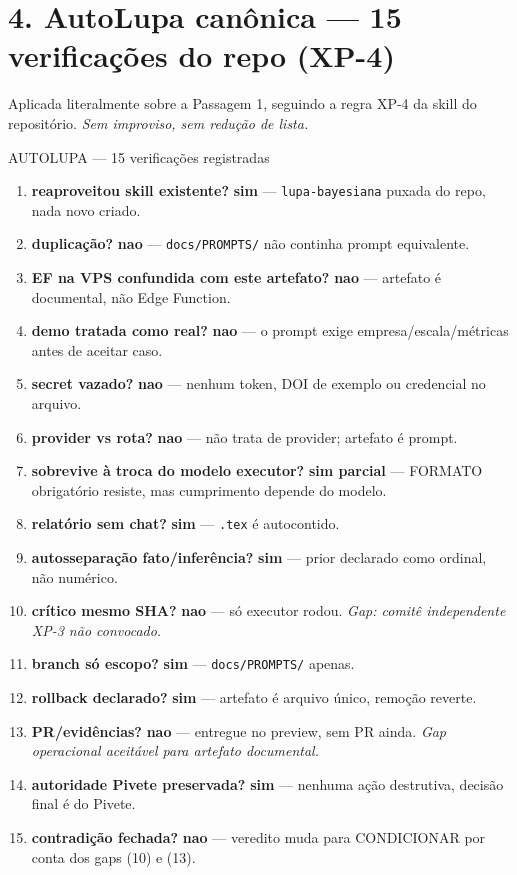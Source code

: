 \documentclass[11pt,a4paper]{article}
\begin{document}
\section*{4. AutoLupa canônica --- 15 verificações do repo (XP-4)}

Aplicada literalmente sobre a Passagem 1, seguindo a regra XP-4
da skill do repositório. \emph{Sem improviso, sem redução de
lista.}

\begin{bloco}{AUTOLUPA --- 15 verificações registradas}
\begin{enumerate}[leftmargin=1.9em]
  \item \textbf{reaproveitou skill existente?} \textbf{sim} ---
        \texttt{lupa-bayesiana} puxada do repo, nada novo criado.
  \item \textbf{duplicação?} \textbf{nao} --- \texttt{docs/PROMPTS/}
        não continha prompt equivalente.
  \item \textbf{EF na VPS confundida com este artefato?}
        \textbf{nao} --- artefato é documental, não Edge Function.
  \item \textbf{demo tratada como real?} \textbf{nao} --- o
        prompt exige empresa/escala/métricas antes de aceitar caso.
  \item \textbf{secret vazado?} \textbf{nao} --- nenhum token,
        DOI de exemplo ou credencial no arquivo.
  \item \textbf{provider vs rota?} \textbf{nao} --- não trata de
        provider; artefato é prompt.
  \item \textbf{sobrevive à troca do modelo executor?}
        \textbf{sim parcial} --- FORMATO obrigatório resiste,
        mas cumprimento depende do modelo.
  \item \textbf{relatório sem chat?} \textbf{sim} --- \texttt{.tex}
        é autocontido.
  \item \textbf{autosseparação fato/inferência?} \textbf{sim} ---
        prior declarado como ordinal, não numérico.
  \item \textbf{crítico mesmo SHA?} \textbf{nao} --- só executor
        rodou. \emph{Gap: comitê independente XP-3 não convocado.}
  \item \textbf{branch só escopo?} \textbf{sim} ---
        \texttt{docs/PROMPTS/} apenas.
  \item \textbf{rollback declarado?} \textbf{sim} --- artefato é
        arquivo único, remoção reverte.
  \item \textbf{PR/evidências?} \textbf{nao} --- entregue no
        preview, sem PR ainda. \emph{Gap operacional aceitável
        para artefato documental.}
  \item \textbf{autoridade Pivete preservada?} \textbf{sim} ---
        nenhuma ação destrutiva, decisão final é do Pivete.
  \item \textbf{contradição fechada?} \textbf{nao} --- veredito
        muda para CONDICIONAR por conta dos gaps (10) e (13).
\end{enumerate}
\end{bloco}
\end{document}
